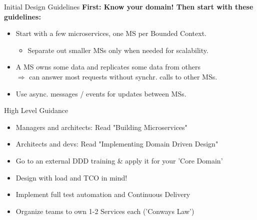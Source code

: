 \begin{frame}[t]{Initial Design Guidelines}
\textbf{First: Know your domain! Then start with these guidelines:}
\begin{itemize}
    \item Start with a few microservices, one MS per Bounded Context. 
    \begin{itemize}
      \item Separate out smaller MSs only when needed for scalability.
    \end{itemize}
    \item A MS owns some data and replicates some data from others \\ 
    $\Rightarrow$ can answer most requests without synchr. calls to other MSs. 
    \item Use async. messages / events for updates between MSs.  
\end{itemize}
\end{frame}


\begin{frame}{High Level Guidance}
\begin{itemize}
    \item Managers and architects: Read "Building Microservices"
    \item Architects and devs: Read "Implementing Domain Driven Design"
    \item Go to an external DDD training \& apply it for your 'Core Domain' 
    \item Design with load and TCO in mind!
    \item Implement full test automation and Continuous Delivery
    \item Organize teams to own 1-2 Services each ('Conways Law')
\end{itemize}
\end{frame}


